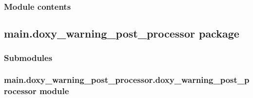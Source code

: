 \documentclass[letterpaper,10pt,english]{sphinxmanual}
\begin{document}
\subsubsection{Module contents}
\label{\detokenize{main.db_operations:module-main.db_operations}}\label{\detokenize{main.db_operations:module-contents}}
\sphinxstepscope


\subsection{main.doxy\_warning\_post\_processor package}
\label{\detokenize{main.doxy_warning_post_processor:main-doxy-warning-post-processor-package}}\label{\detokenize{main.doxy_warning_post_processor::doc}}

\subsubsection{Submodules}
\label{\detokenize{main.doxy_warning_post_processor:submodules}}

\subsubsection{main.doxy\_warning\_post\_processor.doxy\_warning\_post\_processor module}
\label{\detokenize{main.doxy_warning_post_processor:module-main.doxy_warning_post_processor.doxy_warning_post_processor}}\label{\detokenize{main.doxy_warning_post_processor:main-doxy-warning-post-processor-doxy-warning-post-processor-module}}
\end{document}
